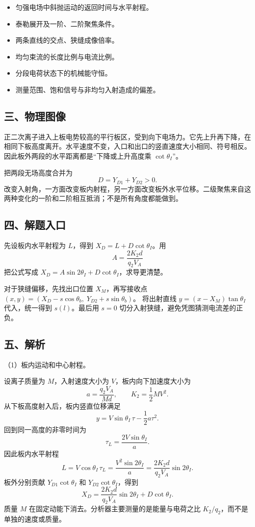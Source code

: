 \documentclass[12pt,a4paper,fontset=fandol]{ctexart}
\providecommand{\tightlist}{\setlength{\itemsep}{0pt}\setlength{\parskip}{0pt}}
\begin{document}
\begin{itemize}
\tightlist
\item
  匀强电场中斜抛运动的返回时间与水平射程。
\item
  泰勒展开及一阶、二阶聚焦条件。
\item
  两条直线的交点、狭缝成像倍率。
\item
  均匀束流的长度比例与电流比例。
\item
  分段电荷状态下的机械能守恒。
\item
  测量范围、饱和信号与非均匀入射造成的偏差。
\end{itemize}

\subsection{三、物理图像}\label{ux4e09ux7269ux7406ux56feux50cf-1}

正二次离子进入上板电势较高的平行板区，受到向下电场力。它先上升再下降，在相同下板高度离开。水平速度不变，入口和出口的竖直速度大小相同、符号相反。因此板外两段的水平距离都是``下降或上升高度乘
\(\cot\theta_I\)''。

把两段无场高度合并为 \[
D=Y_{D1}+Y_{D2}>0.
\]
改变入射角，一方面改变板内射程，另一方面改变板外水平位移。二级聚焦来自这两种变化的一阶和二阶相互抵消；不是所有角度都能做到。

\subsection{四、解题入口}\label{ux56dbux89e3ux9898ux5165ux53e3-1}

先设板内水平射程为 \(L\)，得到 \(X_D=L+D\cot\theta_I\)。用 \[
A=\frac{2K_2d}{q_2V_A}
\] 把公式写成 \(X_D=A\sin2\theta_I+D\cot\theta_I\)，求导更清楚。

对于狭缝偏移，先找出口位置 \(X_M\)，再写接收点
\((x,y)=(X_D-s\cos\theta_b,\;Y_{D2}+s\sin\theta_b)\)。 将出射直线
\(y=(x-X_M)\tan\theta_I\) 代入，统一得到 \(s(l)\)。最后用 \(s=0\)
切分入射狭缝，避免凭图猜测电流差的正负。

\subsection{五、解析}\label{ux4e94ux89e3ux6790-1}

（1）板内运动和中心射程。

设离子质量为 \(M\)，入射速度大小为 \(V\)，板内向下加速度大小为 \[
a=\frac{q_2V_A}{Md},\qquad K_2=\frac12MV^2.
\] 从下板高度射入后，板内竖直位移满足 \[
y=V\sin\theta_I\,\tau-\frac12a\tau^2.
\] 回到同一高度的非零时间为 \[
\tau_L=\frac{2V\sin\theta_I}{a}.
\] 因此板内水平射程 \[
L=V\cos\theta_I\,\tau_L
=\frac{V^2\sin2\theta_I}{a}
=\frac{2K_2d}{q_2V_A}\sin2\theta_I.
\] 板外分别贡献 \(Y_{D1}\cot\theta_I\) 和 \(Y_{D2}\cot\theta_I\)，得到
\[
\boxed{X_D=\frac{2K_2d}{q_2V_A}\sin2\theta_I
+D\cot\theta_I.}\tag{2.1}
\] 质量 \(M\) 在固定动能下消去。分析器主要测量的是能量与电荷之比
\(K_2/q_2\)，而不是单独的速度或质量。
\end{document}
